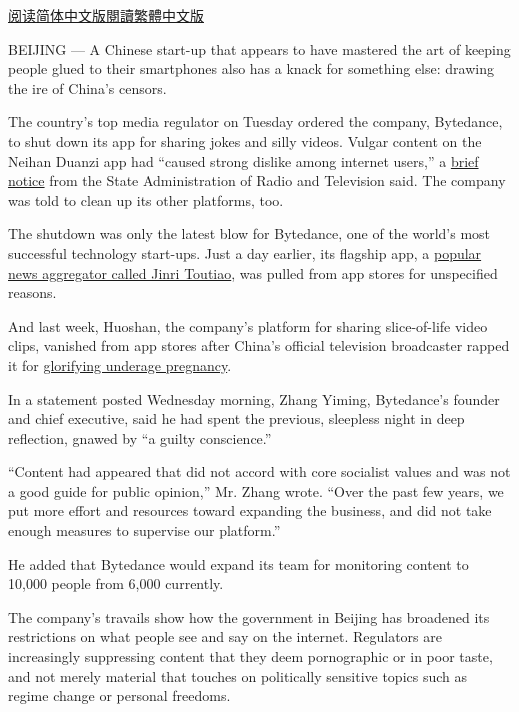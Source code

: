 \href{https://cn.nytimes.com/technology/20180412/china-toutiao-bytedance-censor/}{阅读简体中文版}\href{https://cn.nytimes.com/technology/20180412/china-toutiao-bytedance-censor/zh-hant/}{閱讀繁體中文版}

BEIJING --- A Chinese start-up that appears to have mastered the art of
keeping people glued to their smartphones also has a knack for something
else: drawing the ire of China's censors.

The country's top media regulator on Tuesday ordered the company,
Bytedance, to shut down its app for sharing jokes and silly videos.
Vulgar content on the Neihan Duanzi app had ``caused strong dislike
among internet users,'' a
\href{http://www.sapprft.gov.cn/sapprft/contents/6582/365922.shtml}{brief
notice} from the State Administration of Radio and Television said. The
company was told to clean up its other platforms, too.

The shutdown was only the latest blow for Bytedance, one of the world's
most successful technology start-ups. Just a day earlier, its flagship
app, a
\href{https://www.nytimes.com/2018/01/02/business/china-toutiao-censorship.html}{popular
news aggregator called Jinri Toutiao}, was pulled from app stores for
unspecified reasons.

And last week, Huoshan, the company's platform for sharing slice-of-life
video clips, vanished from app stores after China's official television
broadcaster rapped it for
\href{https://www.nytimes.com/2018/04/06/technology/china-censor-teen-moms.html}{glorifying
underage pregnancy}.

In a statement posted Wednesday morning, Zhang Yiming, Bytedance's
founder and chief executive, said he had spent the previous, sleepless
night in deep reflection, gnawed by ``a guilty conscience.''

``Content had appeared that did not accord with core socialist values
and was not a good guide for public opinion,'' Mr. Zhang wrote. ``Over
the past few years, we put more effort and resources toward expanding
the business, and did not take enough measures to supervise our
platform.''

He added that Bytedance would expand its team for monitoring content to
10,000 people from 6,000 currently.

The company's travails show how the government in Beijing has broadened
its restrictions on what people see and say on the internet. Regulators
are increasingly suppressing content that they deem pornographic or in
poor taste, and not merely material that touches on politically
sensitive topics such as regime change or personal freedoms.

